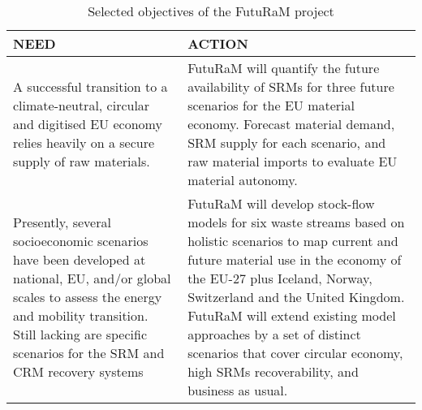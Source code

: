 \begin{table}[h!]
  \centering
  \small
  \caption{Selected objectives of the FutuRaM project}\label{tab:fm-objectives}
  \begin{tabular}{|L{7cm}|L{7cm}|}
    \hline
    \color{white}\textbf{NEED}                                                                                                                                                                                       & \color{white}\textbf{ACTION}                                                                                                                                                                                               \\
    \hline
    A successful transition to a climate-neutral, circular and digitised EU economy relies heavily on a secure supply of raw materials.                                                                                                   & FutuRaM will quantify the future availability of SRMs for three future scenarios for the EU material economy. \vspace{\baselineskip}
    Forecast material demand, SRM supply for each scenario, and raw material imports to evaluate EU material autonomy.                                                                                                                                                                                                                                                                                                                                                 \\
    \hline
    Presently, several socioeconomic scenarios have been developed at national, EU, and/or global scales to assess the energy and mobility transition. \vspace{\baselineskip} Still lacking are specific scenarios for the SRM and CRM recovery systems & FutuRaM will develop stock-flow models for six waste streams based on holistic scenarios to map current and future material use in the economy of the EU-27 plus Iceland, Norway, Switzerland and the United Kingdom. \vspace{\baselineskip}
    FutuRaM will extend existing model approaches by a set of distinct scenarios that cover circular economy, high SRMs recoverability, and business as usual.                                                                                                                                                                                                                                                                                                        \\
    \hline
  \end{tabular}
\end{table}

